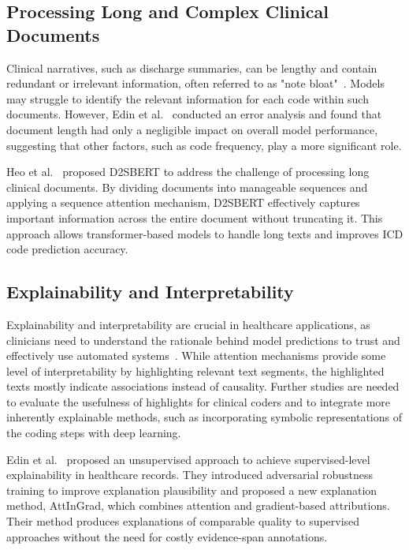 \documentclass[12pt,a4paper]{report}
\begin{document}
\subsection{Processing Long and Complex Clinical Documents}

Clinical narratives, such as discharge summaries, can be lengthy and contain redundant or irrelevant information, often referred to as "note bloat"~\cite{wrenn2010quantifying}. Models may struggle to identify the relevant information for each code within such documents. However, Edin et al.~\cite{edin2023automated} conducted an error analysis and found that document length had only a negligible impact on overall model performance, suggesting that other factors, such as code frequency, play a more significant role.

Heo et al.~\cite{heo2022medical} proposed D2SBERT to address the challenge of processing long clinical documents. By dividing documents into manageable sequences and applying a sequence attention mechanism, D2SBERT effectively captures important information across the entire document without truncating it. This approach allows transformer-based models to handle long texts and improves ICD code prediction accuracy.

\subsection{Explainability and Interpretability}

Explainability and interpretability are crucial in healthcare applications, as clinicians need to understand the rationale behind model predictions to trust and effectively use automated systems~\cite{holzinger2017we}. While attention mechanisms provide some level of interpretability by highlighting relevant text segments, the highlighted texts mostly indicate associations instead of causality. Further studies are needed to evaluate the usefulness of highlights for clinical coders and to integrate more inherently explainable methods, such as incorporating symbolic representations of the coding steps with deep learning.

Edin et al.~\cite{edin2024unsupervised} proposed an unsupervised approach to achieve supervised-level explainability in healthcare records. They introduced adversarial robustness training to improve explanation plausibility and proposed a new explanation method, AttInGrad, which combines attention and gradient-based attributions. Their method produces explanations of comparable quality to supervised approaches without the need for costly evidence-span annotations.
\end{document}
